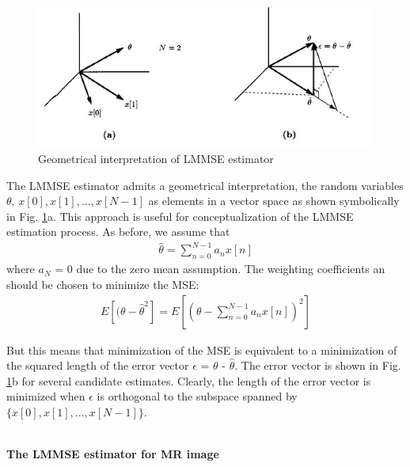 \begin{figure}[H]
\centering{}\includegraphics[scale=0.7]{figures/Module_4/LMMSE-estimator}\caption{Geometrical interpretation of LMMSE estimator} \label{fig:figures/Module_4/LMMSE-estimator}
\end{figure}


The LMMSE estimator admits a geometrical interpretation, the random variables $\theta$, $x[0], x[1], ... , x[N - 1]$ as elements in a vector space as shown symbolically in Fig. \ref{fig:figures/Module_4/LMMSE-estimator}a. This approach is useful for conceptualization of the LMMSE estimation process. As before, we assume that
\begin{equation}
\begin{aligned}\widehat{\theta}=\sum\limits_{n=0}^{N-1} a_nx[n] \end{aligned}
\label{m4eq1-2}
\end{equation}
where $a_N$ = 0 due to the zero mean assumption. The weighting coefficients an should be chosen to minimize the MSE:
\begin{equation}
\begin{aligned}E[(\theta - \widehat{\theta}^2]= E[(\theta-\sum\limits_{n=0}^{N-1} a_nx[n])^2]\end{aligned}
\label{m4eq1-1}
\end{equation}

But this means that minimization of the MSE is equivalent to a minimization of the squared length of the error vector $\epsilon$ = $\theta$ - $\widehat{\theta}$. The error vector is shown in Fig. \ref{fig:figures/Module_4/LMMSE-estimator}b for several candidate estimates. Clearly, the length of the error vector is minimized when $\epsilon$ is orthogonal to the subspace spanned by $\{x[0], x[1], ... , x[N - 1]\}$.

\hfill{}\\
\textbf{The LMMSE estimator for MR image}\\


